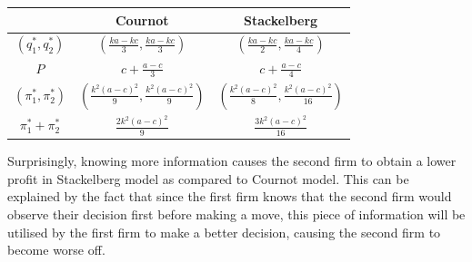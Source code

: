 \documentclass[math]{amznotes}
\theoremstyle{remark}
\begin{document}
\begin{center}
    \begin{tabular}{|c|c|c|}
        \hline 
        & Cournot & Stackelberg \\
        \hline
        $\left(q_1^*, q_2^*\right)$ & $\left(\frac{ka - kc}{3}, \frac{ka - kc}{3}\right)$ & $\left(\frac{ka - kc}{2}, \frac{ka - kc}{4}\right)$ \\
        \hline
        $P$ & $c + \frac{a - c}{3}$ & $c + \frac{a - c}{4}$ \\
        \hline
        $\left(\pi_1^*, \pi_2^*\right)$ & $\left(\frac{k^2\left(a - c\right)^2}{9}, \frac{k^2\left(a - c\right)^2}{9}\right)$ & $\left(\frac{k^2\left(a - c\right)^2}{8}, \frac{k^2\left(a - c\right)^2}{16}\right)$ \\
        \hline
        $\pi_1^* + \pi_2^*$ & $\frac{2k^2\left(a - c\right)^2}{9}$ & $\frac{3k^2\left(a - c\right)^2}{16}$ \\
        \hline
    \end{tabular}
\end{center}
Surprisingly, knowing more information causes the second firm to obtain a lower profit in Stackelberg model as compared to Cournot model. This can be explained by the fact that since the first firm knows that the second firm would observe their decision first before making a move, this piece of information will be utilised by the first firm to make a better decision, causing the second firm to become worse off.
\end{document}
